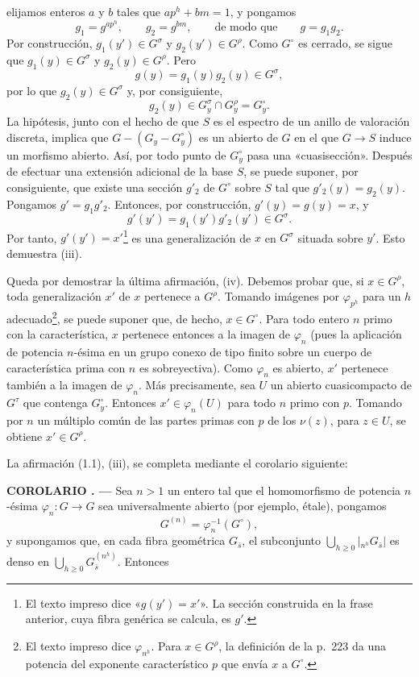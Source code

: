 \documentclass[11pt,twoside,openany]{book}
\numberwithin{equation}{section}
\newcommand{\src}[1]{%
  \phantomsection\hypertarget{src:#1}{}%
  \marginpar{\raggedleft\footnotesize\sffamily #1}%
}
\theoremstyle{plain}
\theoremstyle{definition}
\theoremstyle{remark}
\newcommand{\result}[2]{%
  \par\medskip\noindent\textbf{#1%
  \if\relax\detokenize{#2}\relax\else\space#2\fi. ---}\enspace
}
\newcommand{\FgaUnitKey}{frontmatter}
\renewcommand{\src}[1]{%
  \phantomsection\hypertarget{src:\FgaUnitKey:#1}{}%
  \marginpar{\raggedleft\footnotesize\sffamily #1}%
}
\theoremstyle{plain}
\theoremstyle{definition}
\theoremstyle{remark}
\begin{document}
\src{227}
elijamos enteros $a$ y $b$ tales que $ap^h+bm=1$, y pongamos
\[
g_1=g^{ap^h},\qquad g_2=g^{bm},\qquad\text{de modo que}\qquad g=g_1g_2.
\]
Por construcción, $g_1(y')\in G^\sigma$ y $g_2(y')\in G^\rho$. Como
$G^\circ$ es cerrado, se sigue que $g_1(y)\in G^\sigma$ y
$g_2(y)\in G^\rho$. Pero
\[
g(y)=g_1(y)g_2(y)\in G^\sigma,
\]
por lo que $g_2(y)\in G^\sigma$ y, por consiguiente,
\[
g_2(y)\in G_y^\sigma\cap G_y^\rho=G_y^\circ.
\]
La hipótesis, junto con el hecho de que $S$ es el espectro de un anillo de
valoración discreta, implica que $G-(G_y-G_y^\circ)$ es un abierto de $G$ en
el que $G\longrightarrow S$ induce un morfismo abierto. Así, por todo punto de
$G_y^\circ$ pasa una «cuasisección». Después de efectuar una extensión
adicional de la base $S$, se puede suponer, por consiguiente, que existe una
sección $g'_2$ de $G^\circ$ sobre $S$ tal que $g'_2(y)=g_2(y)$. Pongamos
$g'=g_1g'_2$. Entonces, por construcción, $g'(y)=g(y)=x$, y
\[
g'(y')=g_1(y')g'_2(y')\in G^\sigma.
\]
Por tanto, $g'(y')=x'$\footnote{El texto impreso dice «$g(y')=x'$». La sección
construida en la frase anterior, cuya fibra genérica se calcula, es $g'$.} es
una generalización de $x$ en $G^\sigma$ situada sobre $y'$. Esto demuestra
(iii).

Queda por demostrar la última afirmación, (iv). Debemos probar que, si
$x\in G^\rho$, toda generalización $x'$ de $x$ pertenece a $G^\rho$. Tomando
imágenes por $\varphi_{p^h}$ para un $h$ adecuado\footnote{El texto impreso
dice $\varphi_{n^h}$. Para $x\in G^\rho$, la definición de la p.~223 da una
potencia del exponente característico $p$ que envía $x$ a $G^\circ$.}, se
puede suponer que, de hecho, $x\in G^\circ$. Para todo entero $n$ primo con la
característica, $x$ pertenece entonces a la imagen de $\varphi_n$ (pues la
aplicación de potencia $n$-ésima en un grupo conexo de tipo finito sobre un
cuerpo de característica prima con $n$ es sobreyectiva). Como $\varphi_n$ es
abierto, $x'$ pertenece también a la imagen de $\varphi_n$. Más precisamente,
sea $U$ un abierto cuasicompacto de $G^\tau$ que contenga $G_y^\circ$.
Entonces $x'\in\varphi_n(U)$ para todo $n$ primo con $p$. Tomando por $n$ un
múltiplo común de las partes primas con $p$ de los $\nu(z)$, para $z\in U$, se
obtiene $x'\in G^\rho$.

La afirmación (1.1), (iii), se completa mediante el corolario siguiente:

\result{COROLARIO}{1.5} Sea $n>1$ un entero tal que el homomorfismo de potencia
$n$-ésima $\varphi_n:G\longrightarrow G$ sea universalmente abierto (por
ejemplo, étale), pongamos
\[
G^{(n)}=\varphi_n^{-1}(G^\circ),
\]
y supongamos que, en cada fibra geométrica $G_{\bar s}$, el subconjunto
$\bigcup_{h\geq0}|{}_{n^h}G_{\bar s}|$ es denso en
$\bigcup_{h\geq0}G_{\bar s}^{(n^h)}$. Entonces
\end{document}
